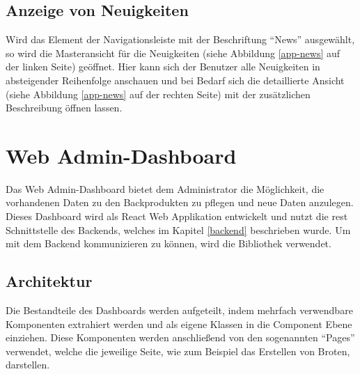 
\clearpage

\subsection{Anzeige von Neuigkeiten}
Wird das Element der Navigationsleiste mit der Beschriftung \enquote{News} ausgewählt, so wird die Masteransicht für die Neuigkeiten (siehe Abbildung \ref{app-news} auf der linken Seite) geöffnet. Hier kann sich der Benutzer alle Neuigkeiten in absteigender Reihenfolge anschauen und bei Bedarf sich die detaillierte Ansicht  (siehe Abbildung \ref{app-news} auf der rechten Seite) mit der zusätzlichen Beschreibung öffnen lassen.


\clearpage

\section{Web Admin-Dashboard}
Das Web Admin-Dashboard bietet dem Administrator die Möglichkeit, die vorhandenen Daten zu den Backprodukten zu pflegen und neue Daten anzulegen. Dieses Dashboard wird als React Web Applikation entwickelt und nutzt die \gls{rest} Schnittstelle des Backends, welches im Kapitel \ref{backend} beschrieben wurde. Um mit dem Backend kommunizieren zu können, wird die Bibliothek  verwendet.

\subsection{Architektur}
Die Bestandteile des Dashboards werden aufgeteilt, indem mehrfach verwendbare Komponenten extrahiert werden und als eigene Klassen in die Component Ebene einziehen. Diese Komponenten werden anschließend von den sogenannten \enquote{Pages} verwendet, welche die jeweilige Seite, wie zum Beispiel das Erstellen von Broten, darstellen. 

